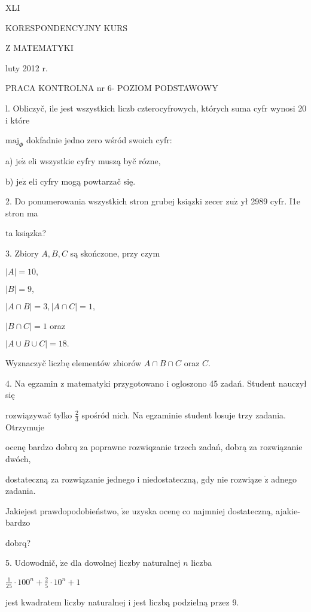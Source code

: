 \documentclass[a4paper,12pt]{article}
\begin{document}
XLI

KORESPONDENCYJNY KURS

Z MATEMATYKI

luty 2012 r.

PRACA KONTROLNA nr 6- POZIOM PODSTAWOWY

l. Obliczyč, ile jest wszystkich liczb czterocyfrowych, których suma cyfr wynosi 20 $\mathrm{i}$ które

$\mathrm{m}\mathrm{a}\mathrm{j}_{\Phi}$ dokfadnie jedno zero wśród swoich cyfr:

a) $\mathrm{j}\mathrm{e}\dot{\mathrm{z}}$ eli wszystkie cyfry muszą byč rózne,

b) $\mathrm{j}\mathrm{e}\dot{\mathrm{z}}$ eli cyfry mogą powtarzač się.

2. Do ponumerowania wszystkich stron grubej ksiązki zecer $\mathrm{z}\mathrm{u}\dot{\mathrm{z}}$ ył 2989 cyfr. I1e stron ma

ta ksiązka?

3. Zbiory $A, B, C$ są skończone, przy czym

$|A|=10,$

$|B|=9,$

$|A\cap B|=3, |A\cap C|=1,$

$|B\cap C|=1$ oraz

$|A\cup B\cup C|=18.$

Wyznaczyč liczbę elementów zbiorów $A\cap B\cap C$ oraz $C.$

4. Na egzamin $\mathrm{z}$ matematyki przygotowano $\mathrm{i}$ ogloszono 45 zadań. Student nauczył się

rozwiązywač tylko $\displaystyle \frac{2}{3}$ spośród nich. Na egzaminie student losuje trzy zadania. Otrzymuje

ocenę bardzo dobrq za poprawne rozwiqzanie trzech zadań, dobrą za rozwiązanie dwóch,

dostateczną za rozwiązanie jednego $\mathrm{i}$ niedostateczną, gdy nie rozwiąze $\dot{\mathrm{z}}$ adnego zadania.

Jakiejest prawdopodobieństwo, $\dot{\mathrm{z}}\mathrm{e}$ uzyska ocenę co najmniej dostateczną, ajakie- bardzo

dobrq?

5. Udowodnič, $\dot{\mathrm{z}}\mathrm{e}$ dla dowolnej liczby naturalnej $n$ liczba

$\displaystyle \frac{1}{25}\cdot 100^{n}+\frac{2}{5}\cdot 10^{n}+1$

jest kwadratem liczby naturalnej $\mathrm{i}$ jest liczbą podzielną przez 9.
\end{document}

